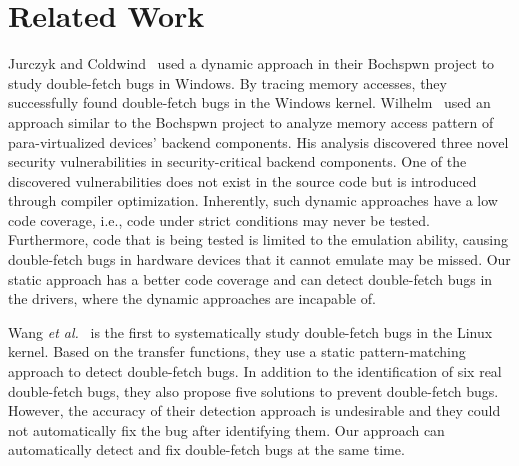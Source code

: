 \documentclass[10pt]{llncs}
\begin{document}
\section{Related Work}
\label{related}



Jurczyk and Coldwind~\cite{bochspwn,jurczyk2013identifying} used a dynamic approach in their Bochspwn project to study double-fetch bugs in Windows. By tracing memory accesses, they successfully found double-fetch bugs in the Windows kernel. Wilhelm~\cite{wilhelm15tracing} used an approach similar to the
Bochspwn project to analyze memory access pattern of para-virtualized
devices' backend components. His analysis discovered three novel security
vulnerabilities in security-critical backend components. One of the
discovered vulnerabilities does not exist in the source code but is
introduced through compiler optimization.
Inherently, such dynamic approaches have a low code coverage, i.e., code under strict conditions may never be tested. Furthermore, code that is being tested is limited to the emulation ability, causing double-fetch bugs in hardware devices that it cannot emulate may be missed. Our static approach has a better code coverage and can detect double-fetch bugs in the drivers, where the dynamic approaches are incapable of.


Wang \textit{et al.}~\cite{wang} is the first to systematically study double-fetch bugs in the Linux kernel. Based on the transfer functions, they use a static pattern-matching approach to detect double-fetch bugs. In addition to the identification of six real double-fetch bugs, they also propose five solutions to prevent double-fetch bugs. However, the accuracy of their detection approach is undesirable and they could not automatically fix the bug after identifying them. %
Our approach can automatically detect and fix double-fetch bugs at the same time.
\end{document}
